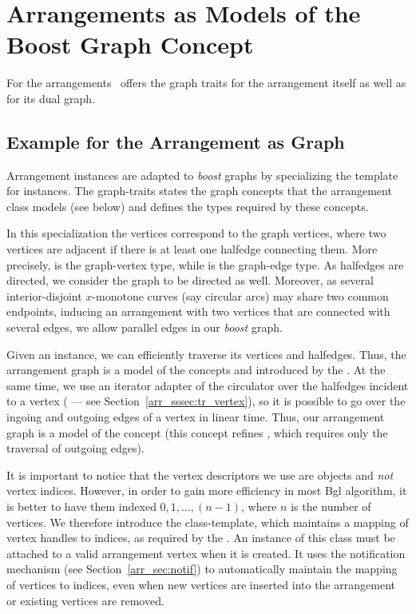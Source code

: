 \section{Arrangements as Models of the Boost Graph Concept}

For the arrangements \cgal\ offers the graph traits for the arrangement
itself as well as for its dual graph.


\subsection{Example for the Arrangement as Graph\label{arr_sssec:bgl_primal}}

Arrangement instances are adapted to {\em boost} graphs by specializing the
 template for  instances. The
graph-traits states the graph concepts that the arrangement class models
(see below) and defines the types required by these concepts.

In this specialization the  vertices correspond to the
graph vertices, where two vertices are adjacent if there is at least one
halfedge connecting them. More precisely, 
is the graph-vertex type, while  is the
graph-edge type. As halfedges are directed, we consider the graph to be
directed as well. Moreover, as several interior-disjoint $x$-monotone curves
(say circular arcs) may share two common endpoints, inducing an arrangement
with two vertices that are connected with several edges, we allow parallel
edges in our {\em boost} graph.

Given an  instance, we can efficiently traverse its
vertices and halfedges. Thus, the arrangement graph is a model of the concepts
 and  introduced by the \bgl.
At the same time, we use an iterator adapter of the circulator over the
halfedges incident to a vertex ( --- see
Section~\ref{arr_sssec:tr_vertex}), so it is possible to go over the ingoing
and outgoing edges of a vertex in linear time. Thus, our arrangement graph
is a model of the concept  (this concept refines
, which requires only the traversal of outgoing edges).

It is important to notice that the vertex descriptors we use are
 objects and {\em not} vertex indices. However, in order
to gain more efficiency in most {\sc Bgl} algorithm, it is better to have them
indexed $0, 1, \ldots, (n-1)$, where $n$ is the number of vertices. We
therefore introduce the  class-template,
which maintains a mapping of vertex handles to indices, as required by the
\bgl. An instance of this class must be attached to a valid arrangement
vertex when it is created. It uses the notification mechanism (see
Section~\ref{arr_sec:notif}) to automatically maintain the mapping of vertices
to indices, even when new vertices are inserted into the arrangement or
existing vertices are removed.

